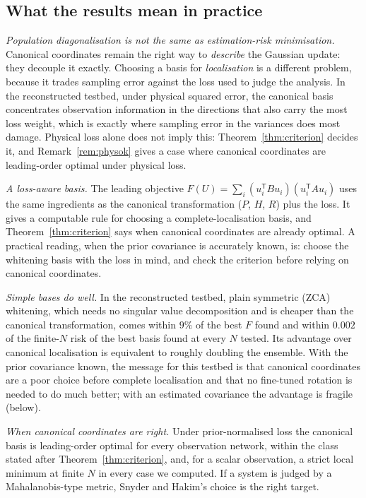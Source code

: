 \documentclass[11pt,a4paper]{article}
\numberwithin{equation}{section}
\theoremstyle{remark}\newtheorem{remark}[theorem]{Remark}
\newcommand{\T}{^{\mathsf T}}
\begin{document}
\subsection{What the results mean in practice}

\emph{Population diagonalisation is not the same as estimation-risk minimisation.} Canonical
coordinates remain the right way to \emph{describe} the Gaussian update: they decouple it
exactly. Choosing a basis for \emph{localisation} is a different problem, because it trades
sampling error against the loss used to judge the analysis. In the reconstructed testbed,
under physical squared error, the canonical basis concentrates observation information in the
directions that also carry the most loss weight, which is exactly where sampling error in the
variances does most damage. Physical loss alone does not imply this: Theorem~\ref{thm:criterion}
decides it, and Remark~\ref{rem:physok} gives a case where canonical coordinates are
leading-order optimal under physical loss.

\emph{A loss-aware basis.} The leading objective \(F(U)=\sum_i(u_i\T Bu_i)(u_i\T Au_i)\) uses the
same ingredients as the canonical transformation (\(P\), \(H\), \(R\)) plus the loss. It gives a
computable rule for choosing a complete-localisation basis, and Theorem~\ref{thm:criterion} says
when canonical coordinates are already optimal. A practical reading, when the prior covariance
is accurately known, is: choose the whitening basis with the loss in mind, and check the
criterion before relying on canonical coordinates.

\emph{Simple bases do well.} In the reconstructed testbed, plain symmetric (ZCA) whitening, which
needs no singular value decomposition and is cheaper than the canonical transformation, comes
within \(9\%\) of the best \(F\) found and within \(0.002\) of the finite-\(N\) risk of the best basis
found at every \(N\) tested. Its advantage over canonical localisation is equivalent to roughly
doubling the ensemble. With the prior covariance known, the message for this testbed is that
canonical coordinates are a poor choice before complete localisation and that no fine-tuned
rotation is needed to do much better; with an estimated covariance the advantage is fragile
(below).

\emph{When canonical coordinates are right.} Under prior-normalised loss the canonical basis is
leading-order optimal for every observation network, within the class stated after
Theorem~\ref{thm:criterion}, and, for a scalar observation, a strict local minimum at finite \(N\)
in every case we computed. If a system is judged by a Mahalanobis-type metric, Snyder and Hakim's
choice is the right target.
\end{document}
